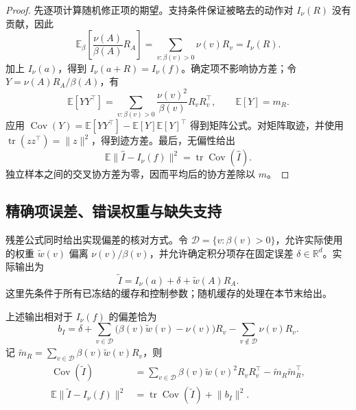 \documentclass[lang=cn,scheme=chinese,openany]{../book/elegantbook}
\newcommand{\E}{\mathbb E}
\begin{document}
\begin{proof}
先逐项计算随机修正项的期望。支持条件保证被略去的动作对 $I_\nu(R)$ 没有贡献，因此
\begin{equation*}
 \E_\beta\!\left[\frac{\nu(A)}{\beta(A)}R_A\right]
 =\sum_{v:\beta(v)>0}\nu(v)R_v=I_\nu(R).
\end{equation*}
加上 $I_\nu(a)$，得到 $I_\nu(a+R)=I_\nu(f)$。确定项不影响协方差；令 $Y=\nu(A)R_A/\beta(A)$，有
\begin{equation*}
 \E[YY^\top]
 =\sum_{v:\beta(v)>0}\frac{\nu(v)^2}{\beta(v)}R_vR_v^\top,
 \qquad \E[Y]=m_R.
\end{equation*}
应用 $\operatorname{Cov}(Y)=\E[YY^\top]-\E[Y]\E[Y]^\top$ 得到矩阵公式。对矩阵取迹，并使用 $\operatorname{tr}(zz^\top)=\lVert z\rVert^2$，得到迹方差。最后，无偏性给出
\begin{equation*}
 \E\lVert\widehat I-I_\nu(f)\rVert^2
 =\operatorname{tr}\operatorname{Cov}(\widehat I).
\end{equation*}
独立样本之间的交叉协方差为零，因而平均后的协方差除以 $m$。
\end{proof}

\subsection{精确项误差、错误权重与缺失支持}

残差公式同时给出实现偏差的核对方式。令 $\mathcal D=\{v:\beta(v)>0\}$，允许实际使用的权重 $\widetilde w(v)$ 偏离 $\nu(v)/\beta(v)$，并允许确定积分项存在固定误差 $\delta\in\mathbb R^d$。实际输出为
\begin{equation*}
 \widetilde I=I_\nu(a)+\delta+\widetilde w(A)R_A.
\end{equation*}
这里先条件于所有已冻结的缓存和控制参数；随机缓存的处理在本节末给出。

\begin{theorem}[三种误差来源的统一偏差]
\label{est:thm:kl-master-bias}
上述输出相对于 $I_\nu(f)$ 的偏差恰为
\begin{equation}
 b_I=\delta
 +\sum_{v\in\mathcal D}\bigl(\beta(v)\widetilde w(v)-\nu(v)\bigr)R_v
 -\sum_{v\notin\mathcal D}\nu(v)R_v.
 \label{est:eq:kl-master-bias}
\end{equation}
记 $\widetilde m_R=\sum_{v\in\mathcal D}\beta(v)\widetilde w(v)R_v$，则
\begin{align}
 \operatorname{Cov}(\widetilde I)
 &=\sum_{v\in\mathcal D}\beta(v)\widetilde w(v)^2R_vR_v^\top
 -\widetilde m_R\widetilde m_R^\top,\\
 \E\lVert\widetilde I-I_\nu(f)\rVert^2
 &=\operatorname{tr}\operatorname{Cov}(\widetilde I)+\lVert b_I\rVert^2.
 \label{est:eq:kl-master-mse}
\end{align}
\end{theorem}
\end{document}
